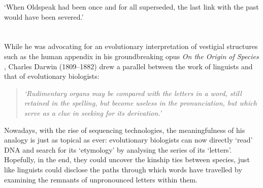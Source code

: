 \begin{savequote}[8cm]

	‘When Oldspeak had been once and for all superseded, the last link with the past would have been severed.’

\end{savequote}

\chapter*{\label{ch:preamble}}



While he was advocating for an evolutionary interpretation of vestigial structures such as the human appendix in his groundbreaking opus \textit{On the Origin of Species} \citeyearpar{darwin1859origin}, Charles Darwin (1809--1882) drew a parallel between the work of linguists and that of evolutionary biologists:

\begin{quote}
	\textit{‘Rudimentary organs may be compared with the letters in a word, still retained in the spelling, but become useless in the pronunciation, but which serve as a clue in seeking for its derivation.’}
\end{quote}


Nowadays, with the rise of sequencing technologies, the meaningfulness of his analogy is just as topical as ever: evolutionary biologists can now directly ‘read’ DNA and search for its ‘etymology’ by analysing the series of its ‘letters’. 
Hopefully, in the end, they could uncover the kinship ties between species, just like linguists could disclose the paths through which words have travelled by examining the remnants of unpronounced letters within them.

